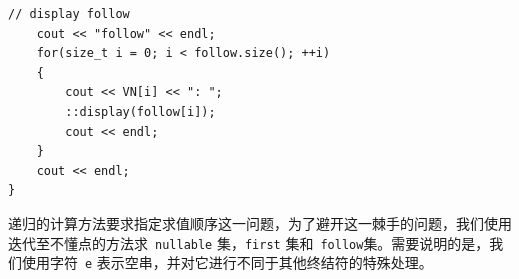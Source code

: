 \documentclass{article}
\begin{document}
\begin{CJK*}{UTF8}{gbsn}
\begin{center}
\begin{lstlisting}[caption = {\texttt{calNullableFirstFollow} 成员函数代码清单}, label = {lst: callst}]
	// display follow
	cout << "follow" << endl;
	for(size_t i = 0; i < follow.size(); ++i)
	{
		cout << VN[i] << ": ";
		::display(follow[i]);
		cout << endl;
	}
	cout << endl;
}
\end{lstlisting}
\end{center}

递归的计算方法要求指定求值顺序这一问题，为了避开这一棘手的问题，我们使用迭代至不懂点的方法求~\texttt{nullable} 集，\texttt{first} 集和~\texttt{follow}集。需要说明的是，我们使用字符~\texttt{e} 表示空串，并对它进行不同于其他终结符的特殊处理。

\end{CJK*}
\end{document}
